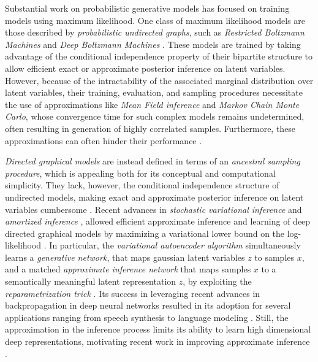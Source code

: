 \documentclass{article}
\begin{document}
Substantial work on probabilistic generative models has focused on training models using maximum likelihood.
One class of maximum likelihood models are those described by \emph{probabilistic undirected graphs}, such as \emph{Restricted Boltzmann Machines} \citep{smolensky1986information} and \emph{Deep Boltzmann Machines} \citep{salakhutdinov2009deep}. These models are trained by taking advantage of the conditional independence property of their bipartite structure to allow efficient exact or approximate posterior inference on latent variables. However, because of the intractability of the associated marginal distribution over latent variables, their training, evaluation, and sampling procedures necessitate the use of approximations like \emph{Mean Field inference} and \emph{Markov Chain Monte Carlo}, whose convergence time for such complex models remains undetermined, often resulting in generation of highly correlated samples. Furthermore, these approximations can often hinder their performance \citep{berglund2013stochastic}. 

\emph{Directed graphical models} are instead defined in terms of an \emph{ancestral sampling procedure}, which is appealing both for its conceptual and computational simplicity. They lack, however, the conditional independence structure of undirected models, making exact and approximate posterior inference on latent variables cumbersome \citep{saul1996mean}. Recent advances in \emph{stochastic variational inference} \citep{hoffman2013stochastic} and \emph{amortized inference} \citep{dayan1995helmholtz, mnih2014neural, kingma2013auto, rezende2014stochastic}, allowed efficient approximate inference and learning of deep directed graphical models by maximizing a variational lower bound on the log-likelihood \citep{neal1998view}. In particular, the \emph{variational autoencoder algorithm} \citep{kingma2013auto, rezende2014stochastic} simultaneously learns a \emph{generative network}, that maps gaussian latent variables $z$ to samples $x$, and a matched \emph{approximate inference network} that maps samples $x$ to a semantically meaningful latent representation $z$, by exploiting the \emph{reparametrization trick} \citep{williams1992simple}.
Its success in leveraging recent advances in backpropagation \citep{rumelhart1988learning, lecun2012efficient} in deep neural networks resulted in its adoption for several applications ranging from speech synthesis \citep{chung2015recurrent} to language modeling \citep{bowman2015generating}. Still, the approximation in the inference process limits its ability to learn high dimensional deep representations, motivating recent work in improving approximate inference \citep{maaloe2016auxiliary, rezende2015variational, salimans2014markov, tran2015variational, burda2015importance,  DBLP:conf/icml/Sohl-DicksteinW15, kingma2016improving}.
\end{document}
